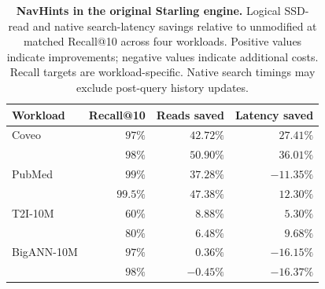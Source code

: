 \begin{table}[t]
\centering
\caption{\textbf{NavHints in the original Starling engine.} Logical SSD-read and native search-latency savings relative to unmodified \Starling at matched Recall@10 across four workloads. Positive values indicate improvements; negative values indicate additional costs. Recall targets are workload-specific. Native search timings may exclude post-query history updates.}
\label{tab:eval-starling}
\small
\setlength{\tabcolsep}{4pt}
\begin{tabular}{@{}lrrr@{}}
\toprule
Workload & Recall@10 & Reads saved & Latency saved \\
\midrule
Coveo & $97\%$ & $\mathbf{42.72\%}$ & $\mathbf{27.41\%}$ \\
      & $98\%$ & $\mathbf{50.90\%}$ & $\mathbf{36.01\%}$ \\
\midrule
PubMed & $99\%$ & $37.28\%$ & $-11.35\%$ \\
       & $99.5\%$ & $47.38\%$ & $12.30\%$ \\
\midrule
T2I-10M & $60\%$ & $8.88\%$ & $5.30\%$ \\
        & $80\%$ & $6.48\%$ & $9.68\%$ \\
\midrule
BigANN-10M & $97\%$ & $0.36\%$ & $-16.15\%$ \\
           & $98\%$ & $-0.45\%$ & $-16.37\%$ \\
\bottomrule
\end{tabular}
\end{table}

